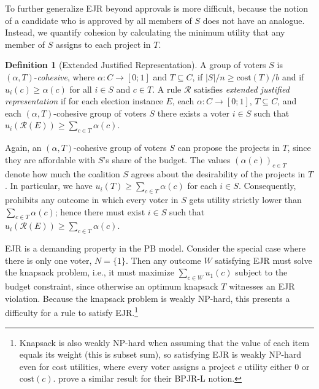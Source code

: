 \documentclass[10pt]{scrartcl}
\renewcommand*{\ge}{\geqslant}
\renewcommand*{\geq}{\geqslant}
\newcommand{\myemph}[1]{{\color{winered}\emph{#1}}}
\newcommand{\cost}{{{\mathrm{cost}}}}
\newcommand{\calR}{{{\mathcal{R}}}}
\theoremstyle{definition}
\newtheorem{definition}{Definition}
\theoremstyle{plain}
\begin{document}
To further generalize EJR beyond approvals is more difficult, because the notion of a candidate who is approved by all members of $S$ does not have an analogue. Instead, we quantify cohesion by calculating the minimum utility that any member of $S$ assigns to each project in $T$.

\begin{definition}[Extended Justified Representation]\label{def:ejr_generalization}
	A group of voters $S$ is $(\alpha, T)$-\emph{cohesive}, where $\alpha\colon C \to [0;1]$ and $T \subseteq C$, if $|S|/n \geq \cost(T)/b$ and if $u_i(c) \geq \alpha(c)$ for  all $i\in S$ and $c \in T$.
A rule $\calR$ satisfies \myemph{extended justified representation} if for each election instance $E$, each $\alpha\colon C \to [0;1]$, $T \subseteq C$, and each $(\alpha, T)$-cohesive group of voters $S$ there exists a voter $i \in S$ such that $u_i(\calR(E)) \geq \sum_{c \in T}\alpha(c)$.
\end{definition}

Again, an $(\alpha, T)$-cohesive group of voters $S$ can propose the projects in $T$, since they are affordable with $S$'s share of the budget. The values $(\alpha(c))_{c\in T}$ denote how much the coalition $S$ agrees about the desirability of the projects in $T$. In particular, we have $u_i(T) \ge \sum_{c \in T}\alpha(c)$ for each $i \in S$. Consequently,  prohibits any outcome in which every voter in $S$ gets utility strictly lower than $\sum_{c \in T}\alpha(c)$; hence there must exist $i \in S$ such that $u_i(\calR(E)) \geq \sum_{c \in T}\alpha(c)$. 

EJR is a demanding property in the PB model. Consider the special case where there is only one voter, $N = \{1\}$. Then any outcome $W$ satisfying EJR must solve the knapsack problem, i.e., it must maximize $\sum_{c\in W} u_1(c)$ subject to the budget constraint, since otherwise an optimum knapsack $T$ witnesses an EJR violation. Because the knapsack problem is weakly NP-hard, this presents a difficulty for a rule to satisfy EJR.\footnote{Knapsack is also weakly NP-hard when assuming that the value of each item equals its weight (this is subset sum), so satisfying EJR is weakly NP-hard even for cost utilities, where every voter assigns a project $c$ utility either 0 or $\cost(c)$. \citet[Prop.~3.8]{aziz2018proportionally} prove a similar result for their BPJR-L notion.}
\end{document}
